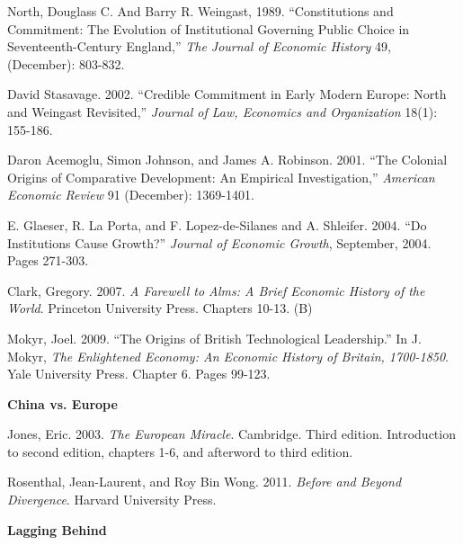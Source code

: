 \documentclass[letterpaper]{article}
\renewenvironment{itemize}{
  \begin{list}{}{
    \setlength{\leftmargin}{1.5em}
  }
}{
  \end{list}
}
\begin{document}
\begin{enumerate}
	\begin{itemize}
		\item[$\bullet$] North, Douglass C. And Barry R. Weingast, 1989. ``Constitutions and Commitment: The Evolution of Institutional Governing Public Choice in Seventeenth-Century England,'' \emph{The Journal of Economic History} 49, (December): 803-832.
		\item[$\bullet$] David Stasavage. 2002. ``Credible Commitment in Early Modern Europe: North and Weingast Revisited,'' \emph{Journal of Law, Economics and Organization} 18(1): 155-186.
		\item[$\bullet$] Daron Acemoglu, Simon Johnson, and James A. Robinson. 2001. ``The Colonial Origins of Comparative Development: An Empirical Investigation,'' \emph{American Economic Review} 91 (December): 1369-1401.
		\item[$\bullet$] E. Glaeser, R. La Porta, and F. Lopez-de-Silanes and A. Shleifer. 2004. ``Do Institutions Cause Growth?'' \emph{Journal of Economic Growth}, September, 2004. Pages 271-303.
		\item[$\bullet$] Clark, Gregory. 2007. \emph{A Farewell to Alms: A Brief Economic History of the World}. Princeton University Press. Chapters 10-13. (B)
		\item[$\bullet$] Mokyr, Joel. 2009. ``The Origins of British Technological Leadership.'' In J. Mokyr, \emph{The Enlightened Economy: An Economic History of Britain, 1700-1850}. Yale University Press. Chapter 6. Pages 99-123.
	\end{itemize}


\item {\bf China vs. Europe}

	\begin{itemize}
		\item[$\bullet$] Jones, Eric. 2003. \emph{The European Miracle}. Cambridge. Third edition. Introduction to second edition, chapters 1-6, and afterword to third edition.
		\item[$\bullet$] Rosenthal, Jean-Laurent, and Roy Bin Wong. 2011. \emph{Before and Beyond Divergence}. Harvard University Press.
	\end{itemize}


\item {\bf Lagging Behind}


\end{enumerate}
\end{document}
